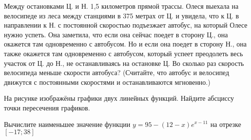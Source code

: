 \documentclass[twocolumn]{article}
\begin{document}
\begin{taskBN}{9}
Между остановками Ц. и Н. 1,5 километров прямой трассы. Олеся выехала на велосипеде из леса между станциями в 375 метрах от Ц. и увидела, что к Ц. в направлении к Н. с постоянной скоростью подъезжает автобус, на который Олесе нужно успеть. Она заметила, что если она сейчас поедет в сторону Ц., она окажется там одновременно с автобусом. Но и если она поедет в сторону Н., она также окажется там одновременно с автобусом, который успеет преодолеть весь участок от Ц. до Н., не останавливаясь на остановке Ц. Во сколько раз скорость велосипеда меньше скорости автобуса? (Считайте, что автобус и велосипед движутся с постоянными скоростями и останавливаются мгновенно.)
\end{taskBN}

\begin{taskBN}{10}
На рисунке изображёны графики двух линейных функций. Найдите абсциссу точки пересечения графиков.\vspace{2.5cm}
\end{taskBN}

\begin{taskBN}{11}
Вычислите наименьшее значение функции $y =95-(12-x)e^{x-11}$ на отрезке $\left[-17;38 \right]$
\end{taskBN}
\end{document}
